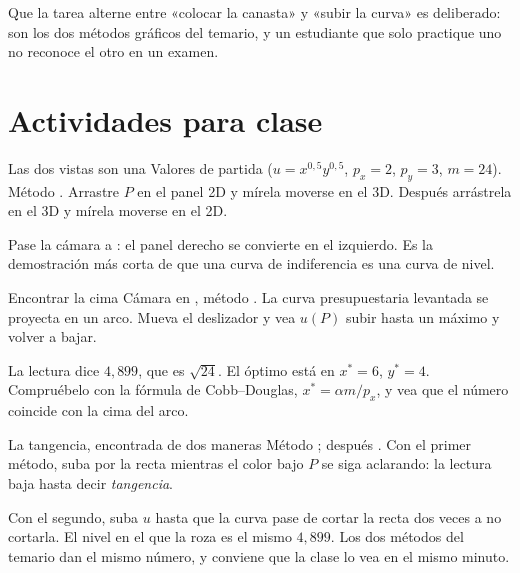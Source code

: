 \documentclass[11pt,a4paper]{appletmanual}
\begin{document}
\begin{amnote}
Que la tarea alterne entre «colocar la canasta» y «subir la curva» es
deliberado: son los dos métodos gráficos del temario, y un estudiante que solo
practique uno no reconoce el otro en un examen.
\end{amnote}

\section{Actividades para clase}

\begin{activity}{Las dos vistas son una}
\amset Valores de partida ($u = x^{0,5}y^{0,5}$, $p_x = 2$, $p_y = 3$,
$m = 24$). Método .
\amexp Arrastre $P$ en el panel 2D y mírela moverse en el 3D. Después
arrástrela en el 3D y mírela moverse en el 2D.
\par\smallskip
Pase la cámara a : el panel derecho se convierte en el izquierdo. Es la
demostración más corta de que una curva de indiferencia es una curva de nivel.
\end{activity}

\begin{activity}{Encontrar la cima}
\amset Cámara en , método .
\amexp La curva presupuestaria levantada se proyecta en un arco. Mueva el
deslizador y vea $u(P)$ subir hasta un máximo y volver a bajar.
\par\smallskip
La lectura  dice $4{,}899$, que es $\sqrt{24}$. El óptimo está en
$x^\ast = 6$, $y^\ast = 4$. Compruébelo con la fórmula de Cobb--Douglas,
$x^\ast = \alpha m/p_x$, y vea que el número coincide con la cima del arco.
\end{activity}

\begin{activity}{La tangencia, encontrada de dos maneras}
\amset Método ; después .
\amexp Con el primer método, suba por la recta mientras el color bajo $P$ se
siga aclarando: la lectura  baja hasta decir \emph{tangencia}.
\par\smallskip
Con el segundo, suba $u$ hasta que la curva pase de cortar la recta dos veces a
no cortarla. El nivel en el que la roza es el mismo $4{,}899$. Los dos métodos
del temario dan el mismo número, y conviene que la clase lo vea en el mismo
minuto.
\end{activity}
\end{document}
